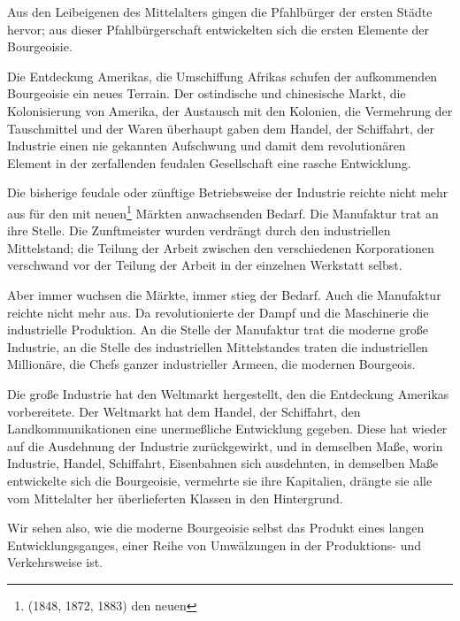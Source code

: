 \documentclass[letterpaper]{article}
\begin{document}
Aus den Leibeigenen des Mittelalters gingen die Pfahlbürger der ersten Städte hervor; aus dieser Pfahlbürgerschaft entwickelten sich die ersten Elemente der Bourgeoisie.

Die Entdeckung Amerikas, die Umschiffung Afrikas schufen der aufkommenden Bourgeoisie ein neues Terrain. Der ostindische und chinesische Markt, die Kolonisierung von Amerika, der Austausch mit den Kolonien, die Vermehrung der Tauschmittel und der Waren überhaupt gaben dem Handel, der Schiffahrt, der Industrie einen nie gekannten Aufschwung und damit dem revolutionären Element in der zerfallenden feudalen Gesellschaft eine rasche Entwicklung.

Die bisherige feudale oder zünftige Betriebsweise der Industrie reichte nicht mehr aus für den mit neuen\footnote{(1848, 1872, 1883) den neuen} Märkten anwachsenden Bedarf. Die Manufaktur trat an ihre Stelle. Die Zunftmeister wurden verdrängt durch den industriellen Mittelstand; die Teilung der Arbeit zwischen den verschiedenen Korporationen verschwand vor der Teilung der Arbeit in der einzelnen Werkstatt selbst.

Aber immer wuchsen die Märkte, immer stieg der Bedarf. Auch die Manufaktur reichte nicht mehr aus. Da revolutionierte der Dampf und die Maschinerie die industrielle Produktion. An die Stelle der Manufaktur trat die moderne große Industrie, an die Stelle des industriellen Mittelstandes traten die industriellen Millionäre, die Chefs ganzer industrieller Armeen, die modernen Bourgeois.

Die große Industrie hat den Weltmarkt hergestellt, den die Entdeckung Amerikas vorbereitete. Der Weltmarkt hat dem Handel, der Schiffahrt, den Landkommunikationen eine unermeßliche Entwicklung gegeben. Diese hat wieder auf die Ausdehnung der Industrie zurückgewirkt, und in demselben Maße, worin Industrie, Handel, Schiffahrt, Eisenbahnen sich ausdehnten, in demselben Maße entwickelte sich die Bourgeoisie, vermehrte sie ihre Kapitalien, drängte sie alle vom Mittelalter her überlieferten Klassen in den Hintergrund.

Wir sehen also, wie die moderne Bourgeoisie selbst das Produkt eines langen Entwicklungsganges, einer Reihe von Umwälzungen in der Produktions- und Verkehrsweise ist.
\end{document}
